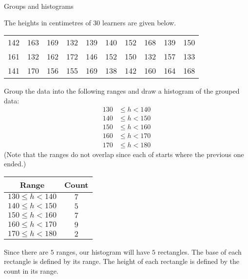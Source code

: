 \begin{wex}{Groups and histograms}{
    The heights in centimetres of $30$ learners are given below.
    \begin{center}
      \begin{tabular}{cccccccccc}
        \toprule
        142 & 163 & 169 & 132 & 139 & 140 & 152 & 168 & 139 & 150\\
        161 & 132 & 162 & 172 & 146 & 152 & 150 & 132 & 157 & 133\\
        141 & 170 & 156 & 155 & 169 & 138 & 142 & 160 & 164 & 168\\
        \bottomrule
      \end{tabular}
    \end{center}

    Group the data into the following ranges and draw a histogram of the
    grouped data:
    \begin{align}
      130 &\le h < 140 \\
      140 &\le h < 150 \\
      150 &\le h < 160 \\
      160 &\le h < 170 \\
      170 &\le h < 180
    \end{align}
    (Note that the ranges do not overlap since each of starts where
    the previous one ended.)
}{
  \begin{center}
    \begin{tabular}{cc}
      \toprule
      Range & Count \\
      \midrule
      $130 \le h < 140$ & $7$ \\
      $140 \le h < 150$ & $5$ \\
      $150 \le h < 160$ & $7$ \\
      $160 \le h < 170$ & $9$ \\
      $170 \le h < 180$ & $2$ \\
      \bottomrule
    \end{tabular}
  \end{center}
  

  Since there are $5$ ranges, our histogram will have $5$
  rectangles. The base of each rectangle is defined by its range. The
  height of each rectangle is defined by the count in its range.
  
}
\end{wex}
